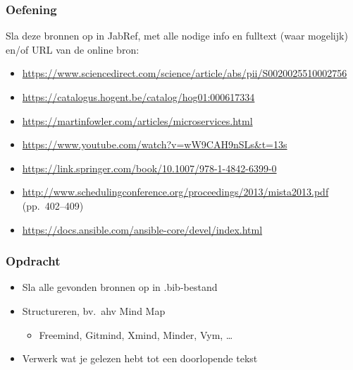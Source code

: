 \documentclass[aspectratio=169]{beamer}
\begin{document}
\begin{frame}[plain]
  \frametitle{Oefening}

  Sla deze bronnen op in JabRef, met alle nodige info en fulltext (waar mogelijk) en/of URL van de online bron:

  \bigskip

  \begin{itemize}
    \item \url{https://www.sciencedirect.com/science/article/abs/pii/S0020025510002756}
    \item \url{https://catalogus.hogent.be/catalog/hog01:000617334}
    \item \url{https://martinfowler.com/articles/microservices.html}
    \item \url{https://www.youtube.com/watch?v=wW9CAH9nSLs&t=13s}
    \item \url{https://link.springer.com/book/10.1007/978-1-4842-6399-0}
    \item \url{http://www.schedulingconference.org/proceedings/2013/mista2013.pdf} (pp.\ 402--409)
    \item \url{https://docs.ansible.com/ansible-core/devel/index.html}
  \end{itemize}

\end{frame}

\begin{frame}
  \frametitle{Opdracht}

  \begin{itemize}
    \item Sla alle gevonden bronnen op in .bib-bestand
    \item Structureren, bv.\ ahv Mind Map
          \begin{itemize}
            \item Freemind, Gitmind, Xmind, Minder, Vym, \ldots
          \end{itemize}
    \item Verwerk wat je gelezen hebt tot een doorlopende tekst
  \end{itemize}

  \bigskip

\end{frame}
\end{document}
